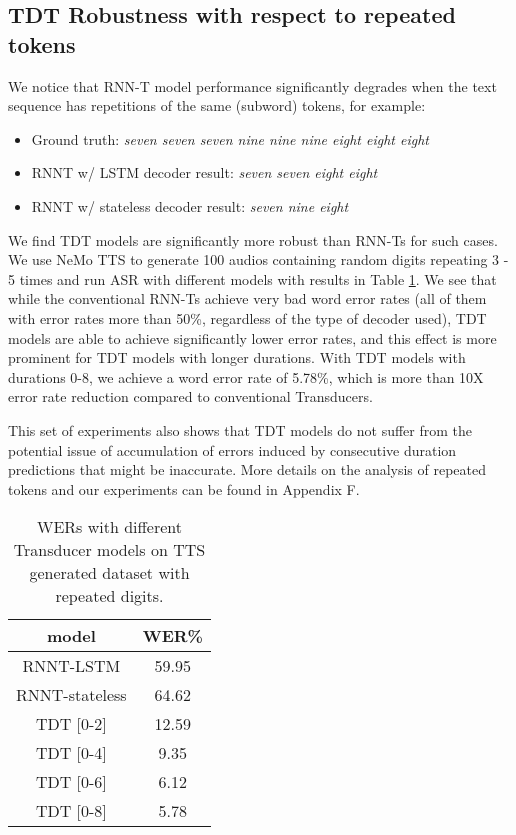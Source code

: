 \documentclass{article}
\begin{document}
\subsection{TDT Robustness with respect to repeated tokens}
We notice that RNN-T model performance significantly degrades when the text sequence has repetitions of the same (subword) tokens, for example:
\begin{itemize}
    \item Ground truth: \emph{seven seven seven nine nine nine eight eight eight}
    \item RNNT w/ LSTM decoder result: \emph{seven seven eight eight}
    \item RNNT w/ stateless decoder result: \emph{seven nine eight}
\end{itemize}
We find TDT models are significantly more robust than RNN-Ts for such cases. 
We use NeMo TTS to generate 100 audios containing random digits repeating 3 - 5 times and run ASR with different models with results in Table \ref{repeated_wer}. We see that while the conventional RNN-Ts achieve very bad word error rates (all of them with error rates more than 50\%, regardless of the type of decoder used), TDT models are able to achieve significantly lower error rates, and this effect is more prominent for TDT models with longer durations. With TDT models with durations 0-8, we achieve a word error rate of 5.78\%, which is more than 10X error rate reduction compared to conventional Transducers. 

This set of experiments also shows that TDT models do not suffer from the potential issue of accumulation of errors induced by consecutive duration predictions that might be inaccurate.
More details on the analysis of repeated tokens and our experiments can be found in Appendix F. 

\begin{table}[]
    \centering
    \begin{tabular}{c c}
    \toprule
        model & WER\%\\
    \midrule
        RNNT-LSTM & 59.95 \\
        RNNT-stateless & 64.62 \\
        TDT [0-2] & 12.59 \\
        TDT [0-4] & 9.35 \\
        TDT [0-6] & 6.12 \\
        TDT [0-8] & 5.78 \\
    \bottomrule
    \end{tabular}
    \caption{WERs with different Transducer models on TTS generated dataset with repeated digits.}
    \label{repeated_wer}
\end{table}
\end{document}
